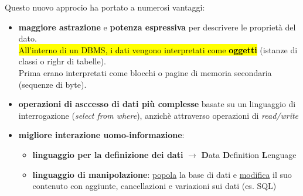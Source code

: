 \documentclass[12pt, a4paper, oneside]{book}
\begin{document}


    Questo nuovo approcio ha portato a numerosi vantaggi:
    \begin{itemize}[label=$\Rightarrow$]
      \item \textbf{maggiore astrazione} e \textbf{potenza espressiva} per descrivere le proprietà del dato.\\[0.2ex]
      \hl{All'interno di un DBMS, i dati vengono interpretati come \textbf{oggetti}} (istanze di classi o righr di tabelle).\\[0.2ex]
      Prima erano interpretati come blocchi o pagine di memoria secondaria (sequenze di byte).

      \medskip

      \item \textbf{operazioni di asccesso di dati più complesse} basate su un linguaggio di interrogazione (\textit{select from where}), anzichè attraverso operazioni di \textit{read/write}
      
      \medskip

      \item \textbf{migliore interazione uomo-informazione}:
        \begin{itemize}[label=$\star$]
          \item \textcolor{azzurrino}{\textbf{linguaggio per la definizione dei dati}} $\rightarrow$ \textcolor{azzurrino}{\textbf{D}}ata \textcolor{azzurrino}{\textbf{D}}efinition \textcolor{azzurrino}{\textbf{L}}enguage
          
          \smallskip

          \item \textcolor{azzurrino}{\textbf{linguaggio di manipolazione}}: \underline{popola} la base di dati e \underline{modifica} il suo contenuto con aggiunte, cancellazioni e variazioni sui dati (es. SQL)
        \end{itemize}
    \end{itemize}
\end{document}
